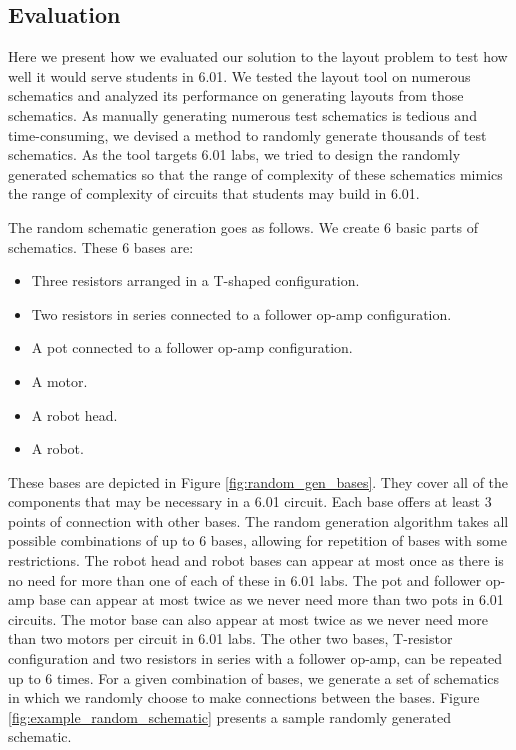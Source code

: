 \subsection{Evaluation}

Here we present how we evaluated our solution to the layout problem
to test how well it would serve students in 6.01.
We tested the layout tool on numerous schematics and
analyzed its performance on generating layouts from those schematics.
As manually generating
numerous test schematics is tedious and time-consuming, we devised a method
to randomly generate thousands of test schematics. As the tool targets 6.01 labs,
we tried to design the randomly generated schematics so that the range of
complexity of these schematics mimics the range of complexity of circuits that
students may build in 6.01.

The random schematic generation goes as follows. We create $6$ basic parts
of schematics. These $6$ bases are:
\begin{itemize}
\item Three resistors arranged in a T-shaped configuration.
\item Two resistors in series connected to a follower op-amp configuration.
\item A pot connected to a follower op-amp configuration.
\item A motor.
\item A robot head.
\item A robot.
\end{itemize}
These bases are depicted in Figure
\ref{fig:random_gen_bases}. They cover all of the components that may be
necessary in a 6.01 circuit. Each base offers at least $3$ points of
connection with other bases. The random generation algorithm takes all
possible combinations of up to
$6$ bases, allowing for repetition of bases with some restrictions.
The robot head and robot bases can appear at most once as there is
no need for more than one of each of these in 6.01 labs. The pot and follower
op-amp base can appear at most twice as we never need more than two pots in 6.01
circuits. The motor base can also appear at most twice as we never need more
than two motors per circuit in 6.01 labs. The other two bases, T-resistor
configuration and two resistors in series with a follower op-amp, can be
repeated up to 6 times. For a given combination of bases, we generate a
set of schematics in which we randomly choose to make connections between the
bases. Figure \ref{fig:example_random_schematic} presents a sample randomly
generated schematic.

